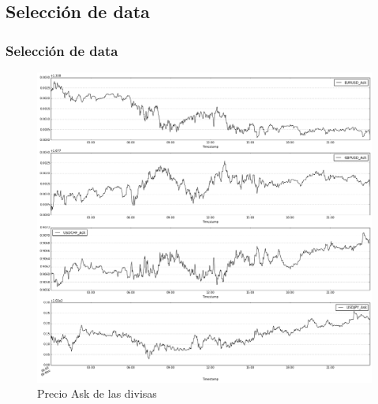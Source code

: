 \documentclass{beamer}
\begin{document}
        \subsection{Selección de data}
            \begin{frame}
            \frametitle{Selección de data} 
            \begin{figure}[h!t]
                \begin{center}
                    \includegraphics[width=0.8\textheight]{img/stocks_ask}
                    \caption{Precio Ask de las divisas}
                    \label{fig:stocks_ask}
                \end{center}
            \end{figure}
            \end{frame}
\end{document}
